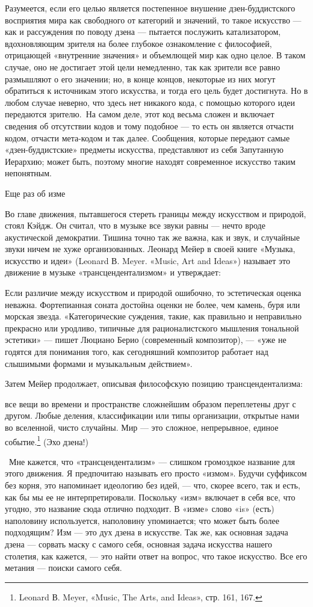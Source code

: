 \documentclass[../main.tex]{subfiles}
\begin{document}
Разумеется, если его целью является постепенное внушение дзен-буддистского восприятия мира как свободного от категорий и значений, то такое искусство --- как и рассуждения по поводу дзена --- пытается послужить катализатором, вдохновляющим зрителя на более глубокое ознакомление с философией, отрицающей «внутренние значения» и объемлющей мир как одно целое. В таком случае, оно не достигает этой цели немедленно, так как зрители все равно размышляют о его значении; но, в конце концов, некоторые из них могут обратиться к источникам этого искусства, и тогда его цель будет достигнута. Но в любом случае неверно, что здесь нет никакого кода, с помощью которого идеи передаются зрителю.~На самом деле, этот код весьма сложен и включает сведения об отсутствии кодов и тому подобное --- то есть он является отчасти кодом, отчасти мета-кодом и так далее. Сообщения, которые передают самые «дзен-буддистские» предметы искусства, представляют из себя Запутанную Иерархию; может быть, поэтому многие находят современное искусство таким непонятным.

Еще раз об изме

Во главе движения, пытавшегося стереть границы между искусством и природой, стоял Кэйдж. Он считал, что в музыке все звуки равны --- нечто вроде акустической демократии. Тишина точно так же важна, как и звук, и случайные звуки ничем не хуже организованных. Леонард Мейер в своей книге «Музыка, искусство и идеи» (Leonard В. Meyer. «Music, Art and Ideas») называет это движение в музыке «трансцендентализмом» и утверждает:

Если различие между искусством и природой ошибочно, то эстетическая оценка неважна. Фортепианная соната достойна оценки не более, чем камень, буря или морская звезда. «Категорические суждения, такие, как правильно и неправильно прекрасно или уродливо, типичные для рационалистского мышления тональной эстетики» --- пишет Люциано Берио (современный композитор), --- «уже не годятся для понимания того, как сегодняшний композитор работает над слышимыми формами и музыкальным действием».

Затем Мейер продолжает, описывая философскую позицию трансцендентализма:

все вещи во времени и пространстве сложнейшим образом переплетены друг с другом. Любые деления, классификации или типы организации, открытые нами во вселенной, чисто случайны. Мир --- это сложное, непрерывное, единое событие.\footnote{Leonard В. Meyer, «Music, The Arts, and Ideas», стр. 161, 167.} (Эхо дзена!)

~Мне кажется, что «трансцендентализм» --- слишком громоздкое название для этого движения. Я предпочитаю называть его просто «измом». Будучи суффиксом без корня, это напоминает идеологию без идей, --- что, скорее всего, так и есть, как бы мы ее не интерпретировали. Поскольку «изм» включает в себя все, что угодно, это название сюда отлично подходит. В «изме» слово «is» (есть) наполовину используется, наполовину упоминается; что может быть более подходящим? Изм --- это дух дзена в искусстве. Так же, как основная задача дзена --- сорвать маску с самого себя, основная задача искусства нашего столетия, как кажется, --- это найти ответ на вопрос, что такое искусство. Все его метания --- поиски самого себя.
\end{document}
